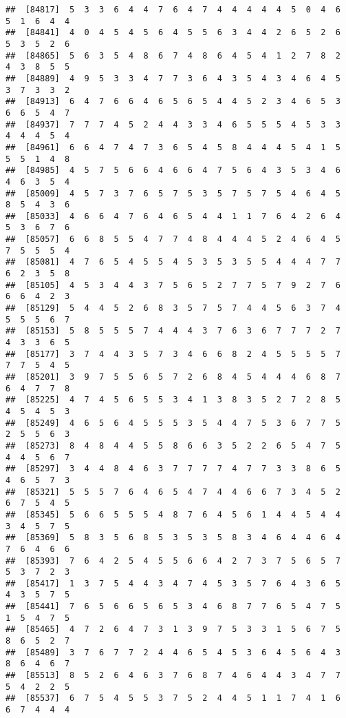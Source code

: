 \documentclass[
]{book}
\begin{document}
\begin{verbatim}
##  [84817]  5  3  3  6  4  4  7  6  4  7  4  4  4  4  4  5  0  4  6  5  1  6  4  4
##  [84841]  4  0  4  5  4  5  6  4  5  5  6  3  4  4  2  6  5  2  6  5  3  5  2  6
##  [84865]  5  6  3  5  4  8  6  7  4  8  6  4  5  4  1  2  7  8  2  4  3  8  5  5
##  [84889]  4  9  5  3  3  4  7  7  3  6  4  3  5  4  3  4  6  4  5  3  7  3  3  2
##  [84913]  6  4  7  6  6  4  6  5  6  5  4  4  5  2  3  4  6  5  3  6  6  5  4  7
##  [84937]  7  7  7  4  5  2  4  4  3  3  4  6  5  5  5  4  5  3  3  4  4  4  5  4
##  [84961]  6  6  4  7  4  7  3  6  5  4  5  8  4  4  4  5  4  1  5  5  5  1  4  8
##  [84985]  4  5  7  5  6  6  4  6  6  4  7  5  6  4  3  5  3  4  6  4  6  3  5  4
##  [85009]  4  5  7  3  7  6  5  7  5  3  5  7  5  7  5  4  6  4  5  8  5  4  3  6
##  [85033]  4  6  6  4  7  6  4  6  5  4  4  1  1  7  6  4  2  6  4  5  3  6  7  6
##  [85057]  6  6  8  5  5  4  7  7  4  8  4  4  4  5  2  4  6  4  5  7  5  5  5  4
##  [85081]  4  7  6  5  4  5  5  4  5  3  5  3  5  5  4  4  4  7  7  6  2  3  5  8
##  [85105]  4  5  3  4  4  3  7  5  6  5  2  7  7  5  7  9  2  7  6  6  6  4  2  3
##  [85129]  5  4  4  5  2  6  8  3  5  7  5  7  4  4  5  6  3  7  4  5  5  5  6  7
##  [85153]  5  8  5  5  5  7  4  4  4  3  7  6  3  6  7  7  7  2  7  4  3  3  6  5
##  [85177]  3  7  4  4  3  5  7  3  4  6  6  8  2  4  5  5  5  5  7  7  7  5  4  5
##  [85201]  3  9  7  5  5  6  5  7  2  6  8  4  5  4  4  4  6  8  7  6  4  7  7  8
##  [85225]  4  7  4  5  6  5  5  3  4  1  3  8  3  5  2  7  2  8  5  4  5  4  5  3
##  [85249]  4  6  5  6  4  5  5  5  3  5  4  4  7  5  3  6  7  7  5  2  5  5  6  3
##  [85273]  8  4  8  4  4  5  5  8  6  6  3  5  2  2  6  5  4  7  5  4  4  5  6  7
##  [85297]  3  4  4  8  4  6  3  7  7  7  7  4  7  7  3  3  8  6  5  4  6  5  7  3
##  [85321]  5  5  5  7  6  4  6  5  4  7  4  4  6  6  7  3  4  5  2  6  7  5  4  5
##  [85345]  5  6  6  5  5  5  4  8  7  6  4  5  6  1  4  4  5  4  4  3  4  5  7  5
##  [85369]  5  8  3  5  6  8  5  3  5  3  5  8  3  4  6  4  4  6  4  7  6  4  6  6
##  [85393]  7  6  4  2  5  4  5  5  6  6  4  2  7  3  7  5  6  5  7  5  3  7  2  3
##  [85417]  1  3  7  5  4  4  3  4  7  4  5  3  5  7  6  4  3  6  5  4  3  5  7  5
##  [85441]  7  6  5  6  6  5  6  5  3  4  6  8  7  7  6  5  4  7  5  1  5  4  7  5
##  [85465]  4  7  2  6  4  7  3  1  3  9  7  5  3  3  1  5  6  7  5  8  6  5  2  7
##  [85489]  3  7  6  7  7  2  4  4  6  5  4  5  3  6  4  5  6  4  3  8  6  4  6  7
##  [85513]  8  5  2  6  4  6  3  7  6  8  7  4  6  4  4  3  4  7  7  5  4  2  2  5
##  [85537]  6  7  5  4  5  5  3  7  5  2  4  4  5  1  1  7  4  1  6  6  7  4  4  4

\end{verbatim}
\end{document}
